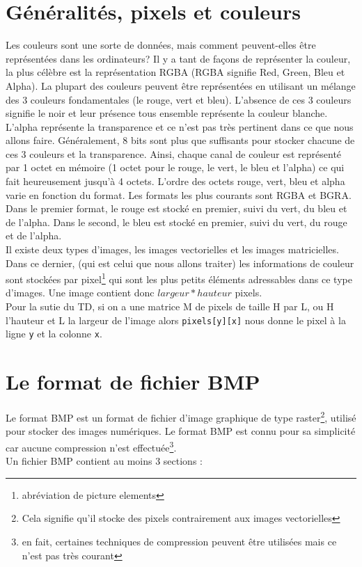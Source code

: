 \documentclass[a4paper]{article}
\begin{document}
	\section*{Généralités, pixels et couleurs}
	Les couleurs sont une sorte de données, mais comment peuvent-elles être représentées dans les ordinateurs? Il y a tant de façons de représenter la couleur, la plus célèbre est la représentation RGBA (RGBA signifie Red, Green, Bleu et Alpha). La plupart des couleurs peuvent être représentées en utilisant un mélange des 3 couleurs fondamentales (le rouge, vert et bleu). L'absence de ces 3 couleurs signifie le noir et leur présence tous ensemble représente la couleur blanche. L'alpha représente la transparence et ce n'est pas très pertinent dans ce que nous allons faire. Généralement, 8 bits sont plus que suffisants pour stocker chacune de ces 3 couleurs et la transparence. Ainsi, chaque canal de couleur est représenté par 1 octet en mémoire (1 octet pour le rouge, le vert, le bleu et l'alpha) ce qui fait heureusement jusqu'à 4 octets. L'ordre des octets rouge, vert, bleu et alpha varie en fonction du format. Les formats les plus courants sont RGBA et BGRA. Dans le premier format, le rouge est stocké en premier, suivi du vert, du bleu et de l'alpha. Dans le second, le bleu est stocké en premier, suivi du vert, du rouge et de l'alpha. \\
	Il existe deux types d'images, les images vectorielles et les images matricielles. Dans ce dernier, (qui est celui que nous allons traiter) les informations de couleur sont stockées par pixel\footnote{abréviation de picture elements} qui sont les plus petits éléments adressables dans ce type d'images. Une image contient donc $largeur * hauteur$ pixels. \\
	Pour la sutie du TD, si on a une matrice M  de pixels de taille H par L, ou H l'hauteur et L la largeur de l'image alors \texttt{pixels[y][x]} nous donne le pixel à la ligne \texttt{y} et la colonne \texttt{x}.
	
	\section*{Le format de fichier BMP}
	Le format BMP est un format de fichier d'image graphique de type raster\footnote{Cela signifie qu'il stocke des pixels contrairement aux images vectorielles}, utilisé pour stocker des images numériques. Le format BMP est connu pour sa simplicité car aucune compression n'est effectuée\footnote{en fait, certaines techniques de compression peuvent être utilisées mais ce n'est pas très courant}. \\
	Un fichier BMP contient au moins 3 sections :
	
\end{document}
